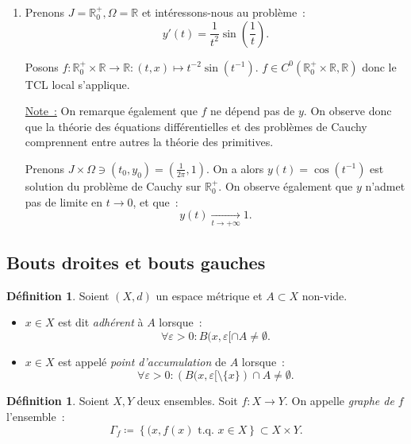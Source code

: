 \documentclass{report}
\theoremstyle{definition}
\newtheorem{déf}[thm]{Définition}
\theoremstyle{remark}
\numberwithin{equation}{section}
\newcommand{\R}{\mathbb R}
\newcommand{\Rp}{\R^{+}}
\newcommand{\tq}{\text{ t.q. }}
\newcommand{\pinfty}{{+\infty}}
\begin{document}
\begin{enumerate}
				\item Prenons $J = \Rp_0, \Omega = \R$ et intéressons-nous au problème~:
				\begin{equation}
					y'(t) = \frac 1{t^2}\sin\left(\frac 1t\right).
				\end{equation}

				Posons $f : \Rp_0 \times \R \to \R : (t, x) \mapsto t^{-2}\sin(t^{-1})$. $f \in C^0(\Rp_0 \times \R, \R)$ donc le TCL local s'applique.

				\underline{Note~:} On remarque également que $f$ ne dépend pas de $y$. On observe donc que la théorie des équations différentielles et des
				problèmes de Cauchy comprennent entre autres la théorie des primitives.

				Prenons $J \times \Omega \ni (t_0, y_0) = \left(\frac 1{2\pi}, 1\right)$. On a alors $y(t) = \cos(t^{-1})$ est solution du problème de Cauchy
				sur $\Rp_0$. On observe également que $y$ n'admet pas de limite en $t \to 0$, et que~:
				\begin{equation}
					y(t) \xrightarrow[t \to \pinfty]{} 1.
				\end{equation}
			\end{enumerate}

		\subsection{Bouts droites et bouts gauches}
			\begin{déf} Soient $(X, d)$ un espace métrique et $A \subset X$ non-vide.

			\begin{itemize}
				\item $x \in X$ est dit \textit{adhérent} à $A$ lorsque~:
				\begin{equation}
					\forall \varepsilon > 0 : B(x, \varepsilon[ \cap A \neq \emptyset.
				\end{equation}
				\item $x \in X$ est appelé \textit{point d'accumulation} de $A$ lorsque~:
				\begin{equation}
					\forall \varepsilon > 0 : \left(B(x, \varepsilon[ \setminus \{x\}\right) \cap A \neq \emptyset.
				\end{equation}
			\end{itemize}
			\end{déf}

			\begin{déf} Soient $X, Y$ deux ensembles. Soit $f : X \to Y$. On appelle \textit{graphe de $f$} l'ensemble~:
			\begin{equation}
				\Gamma_f \coloneqq \left\{(x, f(x) \tq x \in X\right\} \subset X \times Y.
			\end{equation}
			\end{déf}
\end{document}
